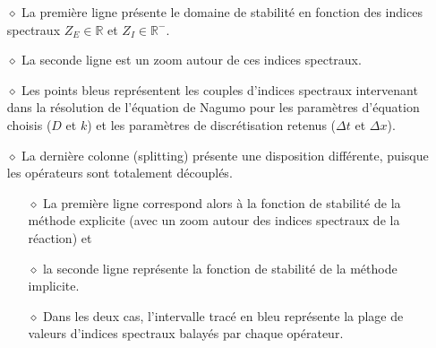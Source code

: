         \begin{itemize}
        \item[$\diamond$] La première ligne présente le domaine de stabilité en fonction des indices spectraux $Z_E \in \mathbb{R}$ et $Z_I \in \mathbb{R}^-$.
        \item[$\diamond$] La seconde ligne est un zoom  autour de ces indices spectraux.
        \item[$\diamond$] Les points bleus représentent les couples d'indices spectraux intervenant dans la résolution de l'équation de Nagumo
        pour les paramètres d'équation choisis ($D$ et $k$) et les paramètres de discrétisation retenus ($\Delta t$ et $\Delta x$).
        
        \item[$\diamond$] La dernière colonne (splitting) présente une disposition différente, puisque les opérateurs sont totalement découplés.
            \begin{itemize}
                \item[$\diamond$] La première ligne correspond alors à la fonction de stabilité de la méthode explicite (avec un zoom autour des indices spectraux de la réaction) et
                \item[$\diamond$] la seconde ligne représente la fonction de stabilité de la méthode implicite. 
                \item[$\diamond$] Dans les deux cas, l'intervalle tracé en bleu représente la plage de valeurs d'indices spectraux balayés par chaque opérateur.
            \end{itemize}
        \end{itemize}
